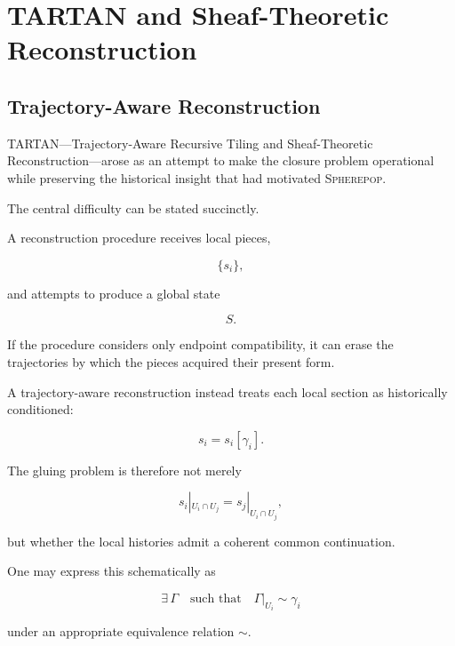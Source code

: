 \documentclass[11pt]{article}
\theoremstyle{remark}
\newcommand{\TARTAN}{\textsc{TARTAN}}
\newcommand{\Spherepop}{\textsc{Spherepop}}
\begin{document}
\section{TARTAN and Sheaf-Theoretic Reconstruction}

\subsection{Trajectory-Aware Reconstruction}

\TARTAN{}---Trajectory-Aware Recursive Tiling and Sheaf-Theoretic Reconstruction---arose as an attempt to make the closure problem operational while preserving the historical insight that had motivated \Spherepop{}.

The central difficulty can be stated succinctly.

A reconstruction procedure receives local pieces,

\begin{equation}
\{s_i\},
\end{equation}

and attempts to produce a global state

\begin{equation}
S.
\end{equation}

If the procedure considers only endpoint compatibility, it can erase the trajectories by which the pieces acquired their present form.

A trajectory-aware reconstruction instead treats each local section as historically conditioned:

\begin{equation}
s_i
=
s_i[\gamma_i].
\end{equation}

The gluing problem is therefore not merely

\begin{equation}
s_i|_{U_i\cap U_j}
=
s_j|_{U_i\cap U_j},
\end{equation}

but whether the local histories admit a coherent common continuation.

One may express this schematically as

\begin{equation}
\exists\,\Gamma
\quad\text{such that}\quad
\Gamma|_{U_i}
\sim
\gamma_i
\end{equation}

under an appropriate equivalence relation $\sim$.
\end{document}
